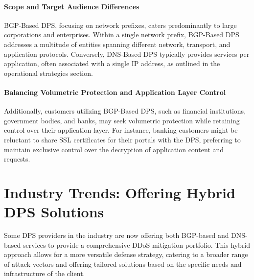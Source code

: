 \paragraph{Scope and Target Audience Differences} BGP-Based DPS, focusing on network prefixes, caters predominantly to large corporations and enterprises. Within a single network prefix, BGP-Based DPS addresses a multitude of entities spanning different network, transport, and application protocols. Conversely, DNS-Based DPS typically provides services per application, often associated with a single IP address, as outlined in the operational strategies section. 

\paragraph{Balancing Volumetric Protection and Application Layer Control} Additionally, customers utilizing BGP-Based DPS, such as financial institutions, government bodies, and banks, may seek volumetric protection while retaining control over their application layer. For instance, banking customers might be reluctant to share SSL certificates for their portals with the DPS, preferring to maintain exclusive control over the decryption of application content and requests.
\section{Industry Trends: Offering Hybrid DPS Solutions}\label{sec:solutions}
Some DPS providers in the industry are now offering both BGP-based and DNS-based services to provide a comprehensive DDoS mitigation portfolio. This hybrid approach allows for a more versatile defense strategy, catering to a broader range of attack vectors and offering tailored solutions based on the specific needs and infrastructure of the client.